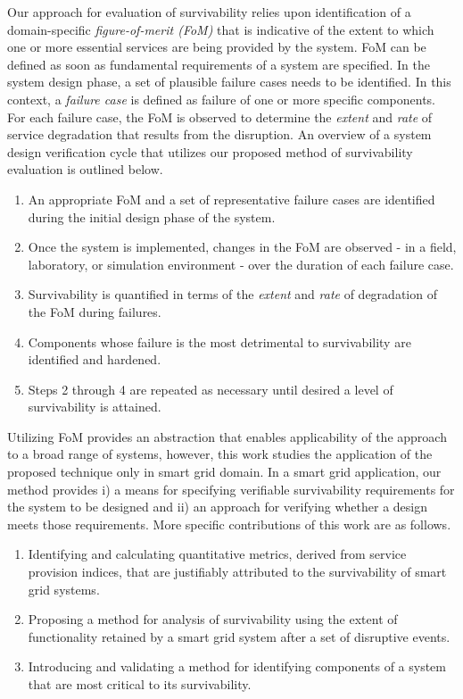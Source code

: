 \documentclass[review]{elsarticle}
\begin{document}
Our approach for evaluation of survivability relies upon identification of a domain-specific \emph{figure-of-merit ({FoM})} that is indicative of the extent to which one or more essential services are being provided by the system. FoM can be defined as soon as fundamental requirements of a system are specified. In the system design phase, a set of plausible failure cases needs to be identified. In this context, a \emph{failure case} is defined as failure of one or more specific components. For each failure case, the FoM is observed to determine the \emph{extent} and \emph{rate} of service degradation that results from the disruption. An overview of a system design verification cycle that utilizes our proposed method of survivability evaluation is outlined below.

\begin{enumerate}
  \item An appropriate FoM and a set of representative failure cases are identified during the initial design phase of the system.
  \item Once the system is implemented, changes in the FoM are observed - in a field, laboratory, or simulation environment - over the duration of each failure case.
  \item Survivability is quantified in terms of the \emph{extent} and \emph{rate} of degradation of the FoM during failures.
  \item Components whose failure is the most detrimental to survivability are identified and hardened.
  \item Steps 2 through 4 are repeated as necessary until desired a level of survivability is attained.
\end{enumerate}

Utilizing FoM provides an abstraction that enables applicability of the approach to a broad range of systems, however, this work studies the application of the proposed technique only in smart grid domain. In a smart grid application, our method provides i) a means for specifying verifiable survivability requirements for the system to be designed and ii) an approach for verifying whether a design meets those requirements. More specific contributions of this work are as follows.

\begin{enumerate}
  \item Identifying and calculating quantitative metrics, derived from service provision indices, that are justifiably attributed to the survivability of smart grid systems.
  \item Proposing a method for analysis of survivability using the extent of functionality retained by a smart grid system after a set of disruptive events.
  \item Introducing and validating a method for identifying components of a system that are most critical to its survivability.
\end{enumerate}
\end{document}
